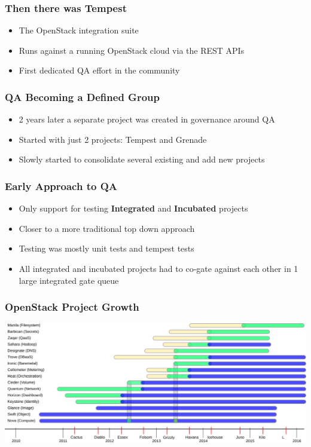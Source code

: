 \documentclass[aspectratio=169,11pt,hyperref={colorlinks=true}]{beamer}
\begin{document}
\begin{frame}
    \frametitle{Then there was Tempest}
    \begin{itemize}
        \item The OpenStack integration suite
        \item Runs against a running OpenStack cloud via the REST APIs
        \item First dedicated QA effort in the community
    \end{itemize}
\end{frame}

\begin{frame}
    \frametitle{QA Becoming a Defined Group}
    \begin{itemize}
        \item 2 years later a separate project was created in governance around QA
        \item Started with just 2 projects: Tempest and Grenade
        \item Slowly started to consolidate several existing and add new projects
    \end{itemize}
\end{frame}

\begin{frame}
    \frametitle{Early Approach to QA}
    \begin{itemize}
        \item Only support for testing \textbf{Integrated} and
              \textbf{Incubated} projects
        \item Closer to a more traditional top down approach
        \item Testing was mostly unit tests and tempest tests
        \item All integrated and incubated projects had to co-gate against
              each other in 1 large integrated gate queue
    \end{itemize}
\end{frame}

\begin{frame}
    \frametitle{OpenStack Project Growth}
    \begin{center}
        \includegraphics[width=1.0\textwidth]{OpenStack_Components.png}
    \end{center}
\end{frame}
\end{document}

